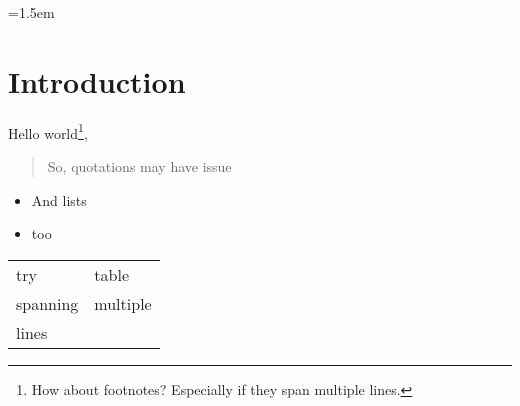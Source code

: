 \documentclass{article}
\begin{document}
\parindent=1.5em

\section{Introduction}

Hello world\footnote{How about footnotes? Especially if they span multiple lines.}, \lipsum[1]

\begin{quotation}
  So, quotations may have issue
\end{quotation}

\lipsum[2]

\begin{itemize}
  \item And lists
  \item too
\end{itemize}

\lipsum[3]

\begin{table}[hbp]
  \begin{tabular}{l l}
    try & table\\
    spanning & multiple\\
    lines & \\
  \end{tabular}
\end{table}

\lipsum[2-3]
\end{document}
